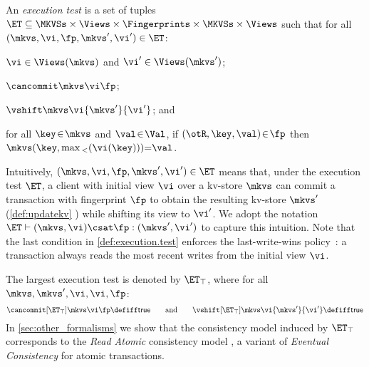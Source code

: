 \begin{definition}
\label{def:execution.test}
An \emph{execution test} is a set of tuples $\ET \subseteq \MKVSs \times \Views \times \Fingerprints \times \MKVSs \times \Views$ 
such that for all $(\mkvs, \vi, \fp, \mkvs', \vi') \in \ET$: 
\begin{enumerate*}
	\item $\vi \in \Views(\mkvs)$ and $\vi' \in \Views(\mkvs')$; 
	\item $\cancommit \mkvs \vi \fp$; 
	\item $\vshift \mkvs \vi {\mkvs'} {\vi'}$; and 
	\item for all $\key \!\in\! \mkvs$ and $\val \!\in\! \Val$, if $(\otR, \key, \val) \!\in\! \fp $ then $	\mkvs(\key, \max{}_{<}(\vi(\key))) {=} \val   $.
\end{enumerate*}



\end{definition}
%
\noindent 
Intuitively, $(\mkvs, \vi, \fp, \mkvs', \vi') \in \ET$ means that, under the execution test $\ET$,
a client with initial view $\vi$ over a kv-store $\mkvs$ can commit a transaction with 
fingerprint $\fp$ to obtain the resulting kv-store $\mkvs'$ (\cref{def:updatekv} ) while shifting its view
to $\vi'$. We adopt the 
notation $\ET \vdash (\mkvs, \vi) \csat \fp: (\mkvs', \vi')$  to
capture this intuition. 
Note that the last condition in \cref{def:execution.test} enforces the last-write-wins
policy~\cite{vogels:2009:ec:1435417.1435432}: 
a transaction always reads the most recent writes from the initial view \(\vi\).  

The largest execution test is denoted by $\ET_{\top}$, where for all $\mkvs, \mkvs', \vi, \vi, \fp$: 
\[
	\cancommit[\ET_{\top}] \mkvs \vi \fp \defiff \mathsf{true}
	\qquad  \text{and} \qquad 
	\vshift[\ET_{\top}] \mkvs \vi {\mkvs'} {\vi'} \defiff \mathsf{true}
\] 
In \cref{sec:other_formalisms} we show that the consistency model induced by $\ET_{\top}$ 
corresponds to the \emph{Read Atomic} consistency model \cite{ramp}, a variant of \emph{Eventual 
Consistency} \cite{ev_transactions} for atomic transactions. 

